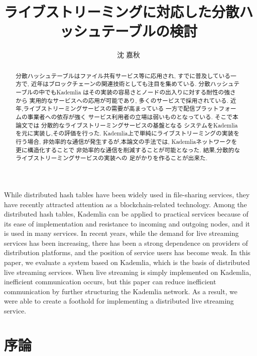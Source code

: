 \documentclass[sotsuron]{jcsie}
\title{ライブストリーミングに対応した分散ハッシュテーブルの検討}
\author{沈 嘉秋}
\begin{document}
\maketitle
\emaketitle
{}
\begin{abstract}    
	分散ハッシュテーブルはファイル共有サービス等に応用され,
	すでに普及している一方で,
	近年はブロックチェーンの関連技術としても注目を集めている.
	分散ハッシュテーブルの中でもKademlia
	はその実装の容易さとノードの出入りに対する耐性の強さから
	実用的なサービスへの応用が可能であり,
	多くのサービスで採用されている.
	近年,ライブストリーミングサービスの需要が高まっている
	一方で配信プラットフォームの事業者への依存が強く
	サービス利用者の立場は弱いものとなっている.
	そこで本論文では
	分散的なライブストリーミングサービスの基盤となる
	システムをKademliaを元に実装し,その評価を行った.
	Kademlia上で単純にライブストリーミングの実装を行う場合,
	非効率的な通信が発生するが,本論文の手法では,
	Kademliaネットワークを更に構造化することで
	非効率的な通信を削減することが可能となった.
	結果,分散的なライブストリーミングサービスの実装への
	足がかりを作ることが出来た.
\end{abstract}
\begin{eabstract}
	While distributed hash tables have been widely used in file-sharing services,
	they have recently attracted attention as a blockchain-related technology. 
	Among the distributed hash tables, 
	Kademlia can be applied to practical services because of 
	its ease of implementation and resistance to incoming and outgoing nodes, 
	and it is used in many services. 
	In recent years, while the demand for live streaming services has been 
	increasing, there has been a strong dependence on providers of distribution 
	platforms, and the position of service users has become weak. 
	In this paper, we evaluate a system based on Kademlia, 
	which is the basis of distributed live streaming services. 
	When live streaming is simply implemented on Kademlia, 
	inefficient communication occurs, but this paper can reduce inefficient 
	communication by further structuring the Kademlia network. 
	As a result, we were able to create a foothold for implementing a 
	distributed live streaming service.
\end{eabstract}
\setcounter{tocdepth}{2}
\tableofcontents
{}


\chapter{序論}
\end{document}
